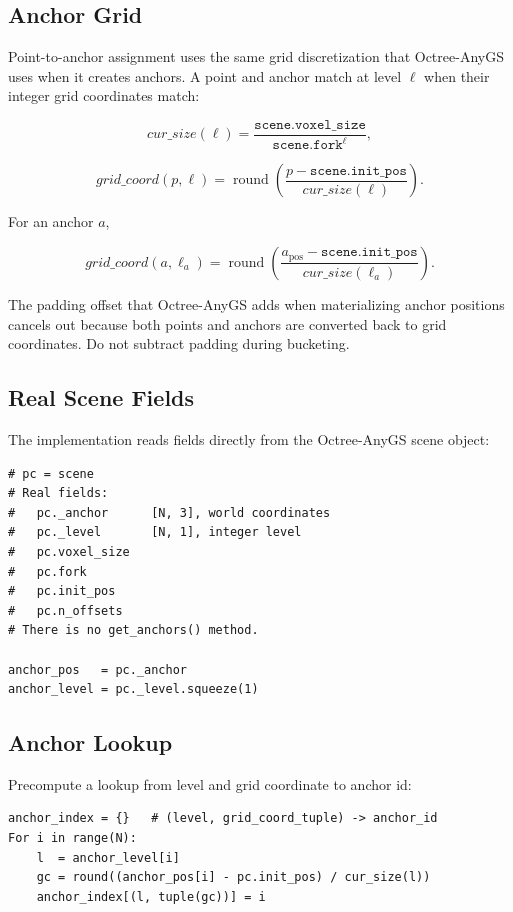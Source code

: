 \documentclass[11pt]{article}
\DeclareMathOperator{\round}{round}
\begin{document}
\subsection{Anchor Grid}

Point-to-anchor assignment uses the same grid discretization that Octree-AnyGS
uses when it creates anchors. A point and anchor match at level \(\ell\) when
their integer grid coordinates match:

\[
  cur\_size(\ell)
  =
  \frac{\texttt{scene.voxel\_size}}{\texttt{scene.fork}^{\ell}},
\]

\[
  grid\_coord(p,\ell)
  =
  \round
  \left(
    \frac{p - \texttt{scene.init\_pos}}{cur\_size(\ell)}
  \right).
\]

For an anchor \(a\),

\[
  grid\_coord(a,\ell_a)
  =
  \round
  \left(
    \frac{a_{\mathrm{pos}} - \texttt{scene.init\_pos}}
         {cur\_size(\ell_a)}
  \right).
\]

The padding offset that Octree-AnyGS adds when materializing anchor positions
cancels out because both points and anchors are converted back to grid
coordinates. Do not subtract padding during bucketing.

\subsection{Real Scene Fields}

The implementation reads fields directly from the Octree-AnyGS scene object:

\begin{lstlisting}
# pc = scene
# Real fields:
#   pc._anchor      [N, 3], world coordinates
#   pc._level       [N, 1], integer level
#   pc.voxel_size
#   pc.fork
#   pc.init_pos
#   pc.n_offsets
# There is no get_anchors() method.

anchor_pos   = pc._anchor
anchor_level = pc._level.squeeze(1)
\end{lstlisting}

\subsection{Anchor Lookup}

Precompute a lookup from level and grid coordinate to anchor id:

\begin{lstlisting}
anchor_index = {}   # (level, grid_coord_tuple) -> anchor_id
For i in range(N):
    l  = anchor_level[i]
    gc = round((anchor_pos[i] - pc.init_pos) / cur_size(l))
    anchor_index[(l, tuple(gc))] = i
\end{lstlisting}
\end{document}
